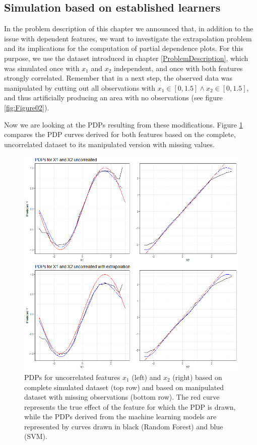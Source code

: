 \documentclass[
]{krantz}
\begin{document}
\hypertarget{ExtrapolationProblemEstablished}{%
\subsection{Simulation based on established learners}\label{ExtrapolationProblemEstablished}}

In the problem description of this chapter we announced that, in addition to the issue with dependent features, we want to investigate the extrapolation problem and its implications for the computation of partial dependence plots. For this purpose, we use the dataset introduced in chapter \ref{ProblemDescription}, which was simulated once with \(x_1\) and \(x_2\) independent, and once with both features strongly correlated. Remember that in a next step, the observed data was manipulated by cutting out all observations with \(x_1 \in [0, 1.5] \wedge x_2 \in [0, 1.5]\), and thus artificially producing an area with no observations (see figure \ref{fig:Figure02}).

Now we are looking at the PDPs resulting from these modifications. Figure \ref{fig:Figure25} compares the PDP curves derived for both features based on the complete, uncorrelated dataset to its manipulated version with missing values.

\begin{figure}

\includegraphics[width=0.9\linewidth]{images/VK_PDP_25_Extrapol_uncor} \hfill{}

\caption{PDPs for uncorrelated features $x_1$ (left) and $x_2$ (right) based on complete simulated dataset (top row) and based on manipulated dataset with missing observations (bottom row). The red curve represents the true effect of the feature for which the PDP is drawn, while the PDPs derived from the machine learning models are represented by curves drawn in black (Random Forest) and blue (SVM).}\label{fig:Figure25}
\end{figure}
\end{document}

